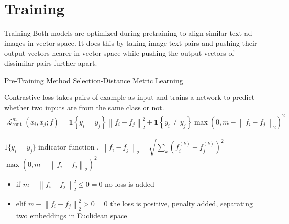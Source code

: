 \documentclass[aspectratio=169,xcolor=dvipsnames]{beamer}
\begin{document}
\section{Training}

\begin{frame}{Training}
    Both models are optimized during pretraining to align similar text ad images in vector space. It does this by taking image-text pairs and pushing their output vectors nearer in vector space while pushing the output vectors of dissimilar pairs further apart.
\end{frame}


\begin{frame}{Pre-Training Method Selection-Distance Metric Learning}
    \begin{block}{Contrastive loss}
    takes pairs of example as input and trains a network to predict whether two inputs are from the same class or not.
     \begin{align*}
        \mathcal{L}_{\text {cont }}^m\left(x_i, x_j ; f\right)=\mathbf{1}\left\{y_i=y_j\right\}\left\|f_i-f_j\right\|_2^2+\mathbf{1}\left\{y_i \neq y_j\right\} \max \left(0, m-\left\|f_i-f_j\right\|_2\right)^2
    \end{align*}
    \end{block}
    \bigskip
    $1\{y_i=y_j\}$ indicator function
    ,
    $\left\|f_i-f_j\right\|_2 = \sqrt{\sum_k(f_i^{(k)}-f_j^{(k)})^2}$ \\
    \medskip
    $\max \left(0, m-\left\|f_i-f_j\right\|_2\right)^2$ 
    \begin{itemize}
        \item if $m-\left\|f_i-f_j\right\|_2^2  \leq 0 =0$ no loss is added\\
        \item elif $m-\left\|f_i-f_j\right\|_2^2  > 0 =0$ the loss is positive, penalty added, separating two embeddings in Euclidean space
    \end{itemize}
    
\end{frame}

\end{document}
